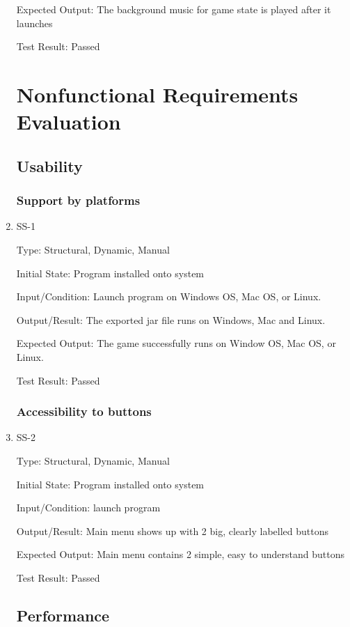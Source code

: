\documentclass[12pt]{article}
\begin{document}
\begin{enumerate}
	Expected Output: The background music for game state is played after it launches
	
	Test Result: Passed
					
					

    \section{Nonfunctional Requirements Evaluation}

    \subsection{Usability}

    \subsubsection{Support by platforms}
    \item SS-1

    Type: Structural, Dynamic, Manual

    Initial State: Program installed onto system 

    Input/Condition: Launch program on Windows OS, Mac OS, or Linux.

    Output/Result: The exported jar file runs on Windows, Mac and Linux.

    Expected Output: The game successfully runs on Window OS, Mac OS, or Linux.
	
	Test Result: Passed

    \subsubsection{Accessibility to buttons}
    \item SS-2

    Type: Structural, Dynamic, Manual

    Initial State: Program installed onto system

    Input/Condition: launch program

    Output/Result: Main menu shows up with 2 big, clearly labelled buttons

    Expected Output: Main menu contains 2 simple, easy to understand buttons
	
	Test Result: Passed


    \subsection{Performance}

\end{enumerate}
\end{document}
